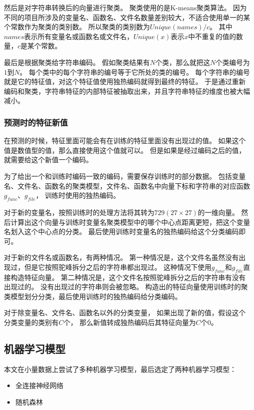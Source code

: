 然后是对字符串转换后的向量进行聚类。
聚类使用的是K-means聚类算法。
因为不同的项目所涉及的变量名、函数名、文件名数量差别较大，不适合使用单一的某个常数作为聚类的类别数。
所以聚类的类别数为$Unique(names) / c$。
其中$names$表示所有变量名或函数名或文件名，$Unique(x)$表示$x$中不重复的值的数量，$c$是某个常数。

最后是根据聚类给字符串编码。
假如聚类结果有$N$个类，那么就把这$N$个类编号为$1$到$N$。
每个类中的每个字符串的编号等于它所处的类的编号。
每个字符串的编号就是它的特征值，对这个特征值使用独热编码就得到最终的特征。
于是通过重新编码和聚类，字符串特征的内部特征被抽取出来，并且字符串特征的维度也被大幅减小。

\subsubsection{预测时的特征新值}

在预测的时候，特征里面可能会有在训练的特征里面没有出现过的值。
如果这个值是数值型的值，那么直接使用这个值就可以。
但是如果是经过编码之后的值，就需要给这个新值一个编码。

为了给出一个和训练时编码一致的编码，需要保存训练时的部分数据。
包括变量名、文件名、函数名的聚类模型，文件名、函数名中向量下标和字符串的对应函数$g_{func}$、$g_{file}$，
训练时使用的独热编码。

对于新的变量名，按照训练时的处理方法将其转为$729 (27 \times 27)$的一维向量。
然后计算出这个向量与训练时变量名聚类模型中的哪个中心点距离更短，把这个变量名划入这个中心点的分类。
最后使用训练时变量名的独热编码给这个分类编码即可。

对于新的文件名或函数名，有两种情况。
第一种情况是，这个文件名虽然没有出现过，但是它按照驼峰拆分之后的字符串都出现过。
这种情况下使用$g_{func}$和$g_{file}$直接构造特征向量。
第二种情况是，这个文件名按照驼峰拆分之后的字符串有没有出现过的。
没有出现过的字符串则会被忽略。
构造出的特征向量使用训练时的聚类模型划分分类，最后使用训练时的独热编码给分类编码。

对于除变量名、文件名、函数名以外的分类变量，
如果出现了新的值，假设这个分类变量的类别有$C$个，
那么新值转成独热编码后其特征向量为$C$个0。

\subsection{机器学习模型}

本文在小量数据上尝试了多种机器学习模型，最后选定了两种机器学习模型：
\begin{itemize}
\item 全连接神经网络
\item 随机森林
\end{itemize}

